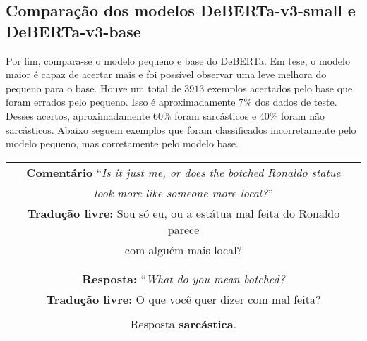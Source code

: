 \subsection{Comparação dos modelos DeBERTa-v3-small e DeBERTa-v3-base}%
\label{sub:comparacao_dos_modelos_deberta-v3-small_e-deberta-v3-base}

Por fim, compara-se o modelo pequeno e base do DeBERTa. Em tese, o
modelo maior é capaz de acertar mais e foi possível observar uma leve melhora do
pequeno para o base. Houve um total de $3913$ exemplos acertados pelo base que
foram errados pelo pequeno. Isso é aproximadamente $7\%$ dos dados de teste.
Desses acertos, aproximadamente $60\%$ foram sarcásticos e $40\%$ foram não
sarcásticos. Abaixo seguem exemplos que foram classificados incorretamente pelo
modelo pequeno, mas corretamente pelo modelo base.

\begin{center}
\begin{tabular}{|c|}

\hline

\textbf{Comentário} ``\textit{Is it just me, or does the botched Ronaldo statue} \\
\textit{look more like someone more local?}'' \\

\textbf{Tradução livre:} Sou só eu, ou a estátua mal feita do Ronaldo parece \\
com alguém mais local? \\ \\

\hline

\\

\textbf{Resposta:} ``\textit{What do you mean botched?} \\

\textbf{Tradução livre:} O que você quer dizer com mal feita? \\ \\

Resposta \textbf{sarcástica}.

\\ \hline

\end{tabular}
\end{center}

